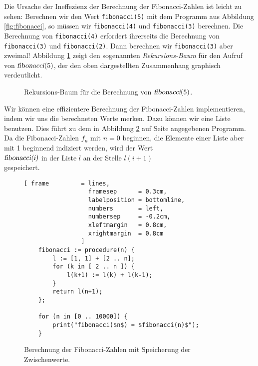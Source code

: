 Die Ursache der Ineffezienz der Berechnung der Fibonacci-Zahlen ist leicht zu sehen: Berechnen wir 
den Wert \texttt{fibonacci(5)} mit dem Programm aus Abbildung
\ref{fig:fibonacci}, so müssen wir \texttt{fibonacci(4)} und \texttt{fibonacci(3)} berechnen.
Die Berechnung von \texttt{fibonacci(4)} erfordert ihrerseits die Berechnung von \texttt{fibonacci(3)} und \texttt{fibonacci(2)}. 
Dann berechnen wir \texttt{fibonacci(3)} aber zweimal!  
Abbildung \ref{fig:fibonacci.eps} zeigt den sogenannten \emph{Rekursions-Baum} für den
Aufruf von $\textsl{fibonacci}(5)$, der den oben dargestellten Zusammenhang graphisch verdeutlicht.

\begin{figure}[!ht]
  \centering
  \caption{Rekursions-Baum für die Berechnung von $\textsl{fibonacci}(5)$.}
  \label{fig:fibonacci.eps}
\end{figure}


Wir können eine effizientere Berechnung der Fibonacci-Zahlen implementieren, indem wir
uns die berechneten Werte merken.  Dazu können wir eine Liste benutzen.
 Dies führt zu dem in Abbildung \ref{fig:fibonacci-dynamic}
auf Seite \pageref{fig:fibonacci-dynamic} angegebenen Programm.  
 Da die Fibonacci-Zahlen $f_n$ mit $n=0$ beginnen, die Elemente einer Liste aber mit
1 beginnend indiziert werden, wird der Wert
\\[0.2cm]
\hspace*{1.3cm}
$\textsl{fibonacci(i)}$ \quad in der Liste $l$ an der Stelle \quad $l(i+1)$
\\[0.2cm]
gespeichert. 

\begin{figure}[!h]
  \centering
\begin{Verbatim}[ frame         = lines, 
                  framesep      = 0.3cm, 
                  labelposition = bottomline,
                  numbers       = left,
                  numbersep     = -0.2cm,
                  xleftmargin   = 0.8cm,
                  xrightmargin  = 0.8cm
                ]
    fibonacci := procedure(n) {
        l := [1, 1] + [2 .. n];
        for (k in [ 2 .. n ]) {
            l(k+1) := l(k) + l(k-1);
        }
        return l(n+1);
    };
    
    for (n in [0 .. 10000]) {
        print("fibonacci($n$) = $fibonacci(n)$");
    }
\end{Verbatim}
\vspace*{-0.3cm}
  \caption{Berechnung der Fibonacci-Zahlen mit Speicherung der Zwischenwerte.}
  \label{fig:fibonacci-dynamic}
\end{figure} 



